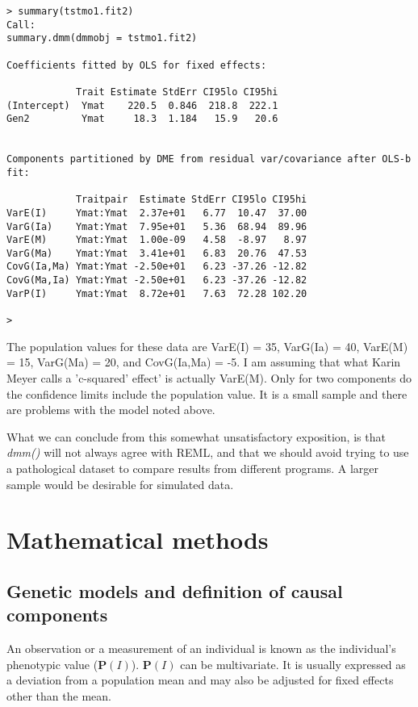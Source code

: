 \documentclass[titlepage]{article}  %
\begin{document}
\begin{verbatim}
> summary(tstmo1.fit2)
Call:
summary.dmm(dmmobj = tstmo1.fit2)

Coefficients fitted by OLS for fixed effects:

            Trait Estimate StdErr CI95lo CI95hi
(Intercept)  Ymat    220.5  0.846  218.8  222.1
Gen2         Ymat     18.3  1.184   15.9   20.6


Components partitioned by DME from residual var/covariance after OLS-b fit:

            Traitpair  Estimate StdErr CI95lo CI95hi
VarE(I)     Ymat:Ymat  2.37e+01   6.77  10.47  37.00
VarG(Ia)    Ymat:Ymat  7.95e+01   5.36  68.94  89.96
VarE(M)     Ymat:Ymat  1.00e-09   4.58  -8.97   8.97
VarG(Ma)    Ymat:Ymat  3.41e+01   6.83  20.76  47.53
CovG(Ia,Ma) Ymat:Ymat -2.50e+01   6.23 -37.26 -12.82
CovG(Ma,Ia) Ymat:Ymat -2.50e+01   6.23 -37.26 -12.82
VarP(I)     Ymat:Ymat  8.72e+01   7.63  72.28 102.20

> 
\end{verbatim}
 
The population values for these data are VarE(I) = 35, VarG(Ia) = 40, VarE(M) = 15, VarG(Ma) = 20, and CovG(Ia,Ma) = -5. I am assuming that what Karin Meyer calls a 'c-squared' effect' is actually VarE(M).  Only for two components do the confidence limits include the population value. It is a small sample and there are problems with the model noted above. 

What we can conclude from this somewhat unsatisfactory exposition, is that {\em dmm()} will not always agree with REML, and that we should avoid trying to use a pathological dataset to compare results from different programs.  A larger sample would be desirable for simulated data.


\clearpage
\section{Mathematical methods}

\subsection{Genetic models and definition of causal components}   
\label{sec:genetics}
An observation or a measurement of an individual is known as the individual's phenotypic value (${\bm P(I)}$). ${\bm P(I)}$ can be multivariate. It is usually expressed as a deviation from a population mean and may also be adjusted for fixed effects other than the mean. 
\end{document}
